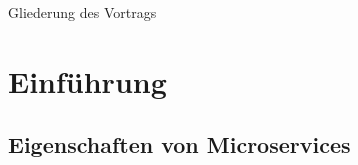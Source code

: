 \documentclass{beamer}
\date{16. Januar 2016}
\def\tocname{Gliederung des Vortrags}
\begin{document}
\fontsize{14pt}{14pt}
	
{
\begin{frame}%
	\titlepage
\end{frame}}

\begin{frame}{\tocname}
	\tableofcontents
\end{frame}

\section{Einführung}

\subsection{Eigenschaften von Microservices}
\end{document}

